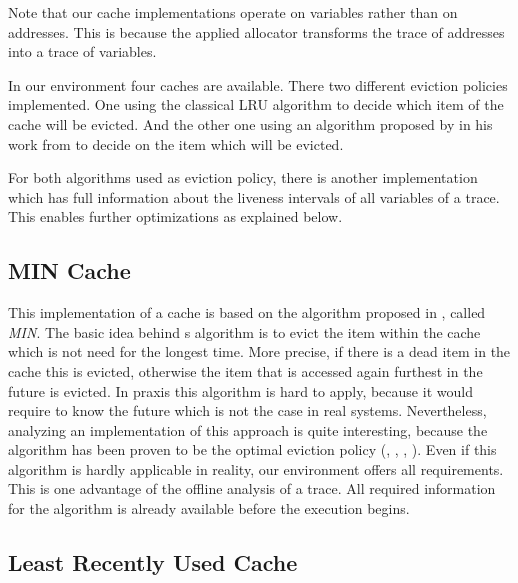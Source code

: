 \documentclass[onecolumn, openright, master, english, signatures]{dbrgrptt}
\begin{document}
\begin{remark}
Note that our cache implementations operate on variables rather than on addresses.
This is because the applied allocator transforms the \ac{trace} of addresses into a \ac{trace} of variables.
\end{remark}

In our environment four caches are available.
There two different eviction policies implemented.
One using the classical \ac{LRU} algorithm to decide which item of the cache will be evicted.
And the other one using an algorithm proposed by  in his work \cite{belady1966study} from \citeyear{belady1966study} to decide on the item which will be evicted.

For both algorithms used as eviction policy, there is another implementation which has full information about the liveness intervals of all variables of a \ac{trace}.
This enables further optimizations as explained below.

\subsection{MIN Cache}\label{ssec:cache-MIN}

This implementation of a cache is based on the algorithm proposed in \cite{belady1966study}, called \emph{\ac{MIN}}.
The basic idea behind \citeauthor{belady1966study}s algorithm is to evict the item within the cache which is not need for the longest time.
More precise, if there is a dead item in the cache this is evicted, otherwise the item that is accessed again furthest in the future is evicted.
In praxis this algorithm is hard to apply, because it would require to know the future which is not the case in real systems.
Nevertheless, analyzing an implementation of this approach is quite interesting, because the algorithm has been proven to be the optimal eviction policy (\cite{mattson1970evaluation}, \cite{van2007short}, \cite{vogler2008another}, \cite{lee2016simple}).
Even if this algorithm is hardly applicable in reality, our environment offers all requirements.
This is one advantage of the offline analysis of a \ac{trace}. All required information for the \citeauthor{belady1966study} algorithm is already available before the execution begins.

\subsection{Least Recently Used Cache}\label{ssec:cache-lru}
\end{document}
